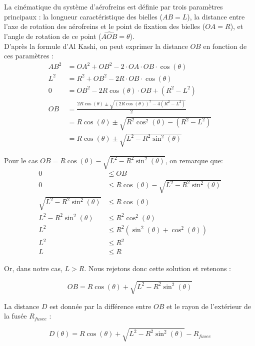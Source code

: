 \vfill

La cinématique du système d'aérofreins est définie par trois paramètres principaux : la longueur caractéristique des bielles
($AB = L$), la distance entre l'axe de rotation des aérofreins et le point de fixation des bielles ($OA = R$), et l'angle de
rotation de ce point ($\widehat{AOB}=\theta$).\\

D'après la formule d'Al Kashi, on peut exprimer la distance $OB$ en fonction de ces paramètres :
\begin{align}
    AB^2    &= OA^2 + OB^2 - 2 \cdot OA \cdot OB \cdot \cos(\theta) \\
    L^2     &= R^2 + OB^2 - 2 R \cdot OB \cdot \cos(\theta) \\
    0       &= OB^2 - 2 R \cos(\theta) \cdot OB + (R^2 - L^2) \\
    OB      &= \frac{2 R \cos(\theta) \pm \sqrt{(2 R \cos(\theta))^2 - 4 (R^2 - L^2)}}{2} \\
            &= R \cos(\theta) \pm \sqrt{R^2 \cos^2(\theta) - (R^2 - L^2)} \\
            &= R \cos(\theta) \pm \sqrt{L^2 - R^2 \sin^2(\theta)}
\end{align}

Pour le cas $OB = R \cos(\theta) - \sqrt{L^2 - R^2 \sin^2(\theta)}$, on remarque que:
\begin{align}
    0 &\leq OB\\
    0 &\leq R \cos(\theta) - \sqrt{L^2 - R^2 \sin^2(\theta)}\\
    \sqrt{L^2 - R^2 \sin^2(\theta)} &\leq R \cos(\theta) \\
    L^2 - R^2 \sin^2(\theta) &\leq R^2 \cos^2(\theta) \\
    L^2 &\leq R^2 (\sin^2(\theta) + \cos^2(\theta)) \\
    L^2 &\leq R^2 \\
    L &\leq R
\end{align}

Or, dans notre cas, $L > R$. Nous rejetons donc cette solution et retenons :

\begin{equation}
    OB = R \cos(\theta) + \sqrt{L^2 - R^2 \sin^2(\theta)}
\end{equation}

La distance $D$ est donnée par la différence entre $OB$ et le rayon de l'extérieur de la fusée $R_{fusee}$ :

\begin{equation}
    D(\theta) = R \cos(\theta) + \sqrt{L^2 - R^2 \sin^2(\theta)} - R_{fusee}
\end{equation}

